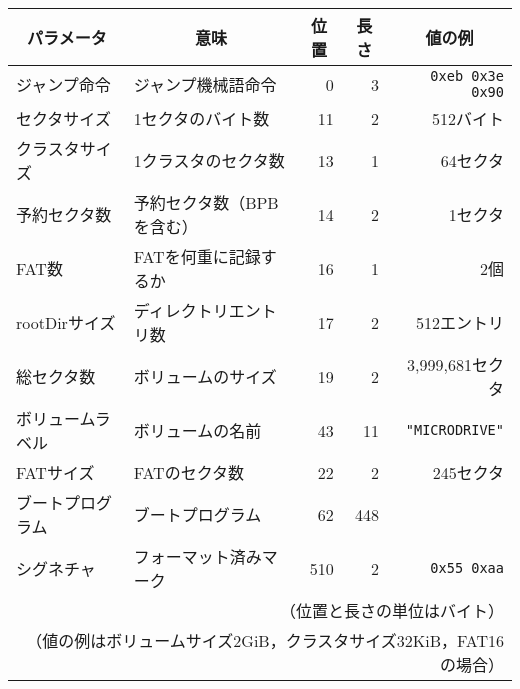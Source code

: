 \documentclass{standalone}
\begin{document}
\begin{tabular}{l | l | r | r | r}\hline\hline
  \multicolumn{1}{c|}{パラメータ} &
  \multicolumn{1}{c|}{意味} &
  \multicolumn{1}{c|}{位置} &
  \multicolumn{1}{c|}{長さ} &
  \multicolumn{1}{c}{値の例}\\\hline
  ジャンプ命令     & ジャンプ機械語命令 & 0 & 3 & \texttt{0xeb 0x3e 0x90} \\
  セクタサイズ     & 1セクタのバイト数 & 11 & 2 & 512バイト \\
  クラスタサイズ   & 1クラスタのセクタ数& 13 & 1 & 64セクタ \\
  予約セクタ数     & 予約セクタ数（BPBを含む）& 14 & 2 & 1セクタ \\
  FAT数            & FATを何重に記録するか& 16 & 1 & 2個 \\
  rootDirサイズ    & ディレクトリエントリ数 &  17 & 2 & 512エントリ \\
  総セクタ数       & ボリュームのサイズ & 19 & 2 & 3,999,681セクタ \\
  ボリュームラベル & ボリュームの名前 & 43 & 11 
                   & \texttt{"MICRODRIVE\textvisiblespace"} \\
  FATサイズ        & FATのセクタ数    & 22 & 2  & 245セクタ \\
  ブートプログラム & ブートプログラム & 62 & 448 & \\
  シグネチャ       & フォーマット済みマーク & 510 & 2 & \texttt{0x55 0xaa} \\
  \multicolumn{5}{r}{
    （位置と長さの単位はバイト）}\\
  \multicolumn{5}{r}{
    （値の例はボリュームサイズ2GiB，クラスタサイズ32KiB，FAT16の場合）}
\end{tabular}
\end{document}
